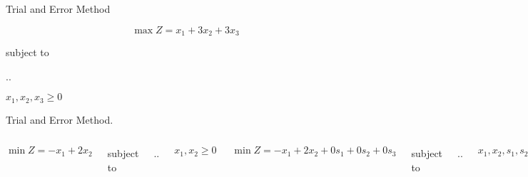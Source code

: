 \begin{frameExample}{Trial and Error Method \label{example:02.15-02}}{}

\[     \max Z = x_1 + 3x_2 + 3x_3\]

{\centering
  subject to

  \sysdelim..%

  \vspace{3mm}
  $x_1, x_2,x_3  \geq 0$
  \par}
\end{frameExample}

\begin{frameExample}{Trial and Error Method. \label{example:02.09-07}}{}
  \begin{columns}[t]
    \[\min Z = -x_1 + 2x_2 \]

    {
      \centering
      subject to

      \sysdelim..%

      \vspace{4mm}
      $x_1, x_2  \geq 0$
      \par
    }

    \[\min Z = -x_1 + 2x_2 + 0s_1 + 0s_2 + 0s_3 \]

    {\centering
      subject to
      
      \sysdelim..%
      
   \vspace{4mm}
   $x_1, x_2, s_1, s_2, s_3  \geq 0$
\par}
  \end{columns}
\end{frameExample}

